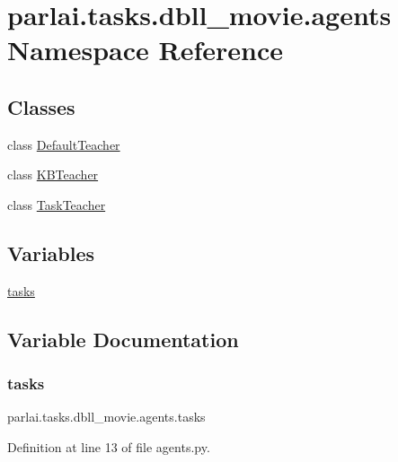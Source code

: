 \hypertarget{namespaceparlai_1_1tasks_1_1dbll__movie_1_1agents}{}\section{parlai.\+tasks.\+dbll\+\_\+movie.\+agents Namespace Reference}
\label{namespaceparlai_1_1tasks_1_1dbll__movie_1_1agents}
\subsection*{Classes}
\begin{DoxyCompactItemize}
\item 
class \hyperlink{classparlai_1_1tasks_1_1dbll__movie_1_1agents_1_1DefaultTeacher}{Default\+Teacher}
\item 
class \hyperlink{classparlai_1_1tasks_1_1dbll__movie_1_1agents_1_1KBTeacher}{K\+B\+Teacher}
\item 
class \hyperlink{classparlai_1_1tasks_1_1dbll__movie_1_1agents_1_1TaskTeacher}{Task\+Teacher}
\end{DoxyCompactItemize}
\subsection*{Variables}
\begin{DoxyCompactItemize}
\item 
\hyperlink{namespaceparlai_1_1tasks_1_1dbll__movie_1_1agents_aa019b5a691f5b7dd5937ab28cabdc10b}{tasks}
\end{DoxyCompactItemize}


\subsection{Variable Documentation}
\mbox{\label{namespaceparlai_1_1tasks_1_1dbll__movie_1_1agents_aa019b5a691f5b7dd5937ab28cabdc10b}} 
\subsubsection{\texorpdfstring{tasks}{tasks}}
{\footnotesize\ttfamily parlai.\+tasks.\+dbll\+\_\+movie.\+agents.\+tasks}



Definition at line 13 of file agents.\+py.

